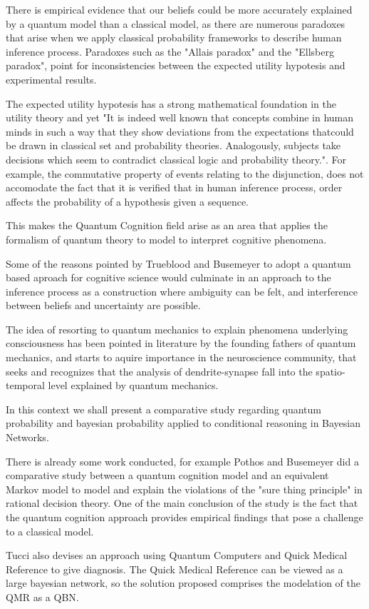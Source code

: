 There is empirical evidence that our beliefs could be more accurately explained by a quantum model than a classical model, as there are numerous paradoxes that arise when we apply classical probability frameworks to describe human inference process\cite[Busemeyer et al]{Busemeyer2009}. 
Paradoxes such as the "Allais paradox" and the "Ellsberg paradox", point for inconsistencies between the expected utility hypotesis and experimental results\cite{Aerts2011}. 

The expected utility hypotesis has a strong mathematical foundation in the utility theory and yet "It is indeed well known that concepts combine in human minds in such a way that they show deviations from the expectations thatcould be drawn in classical set and probability theories. Analogously, subjects take decisions which seem to
contradict classical logic and probability theory."\cite{Aerts2011}. 
For example, the commutative property of events relating to the disjunction, does not accomodate the fact that it is verified\cite{TruebloodJ} that in human inference process, order affects the probability of a hypothesis given a sequence.


This makes the Quantum Cognition field arise as an area that applies the formalism of quantum theory to model to interpret cognitive phenomena. 

Some of the reasons pointed by Trueblood and Busemeyer\cite{Trueblood} to adopt a quantum based aproach for cognitive science would culminate in an approach to the inference process as a construction where ambiguity can be felt, and interference between beliefs and uncertainty are possible. 

The idea of resorting to quantum mechanics to explain phenomena underlying consciousness has been pointed in literature by the founding fathers of quantum mechanics, and starts to aquire importance in the neuroscience community, that seeks and recognizes that the analysis of dendrite-synapse fall into the spatio-temporal level explained by quantum mechanics\cite{Tarlaci2010}.

In this context we shall present a comparative study regarding quantum probability and bayesian probability applied to conditional reasoning in Bayesian Networks. 

There is already some work conducted, for example Pothos and Busemeyer \cite{Pothos2009} did a comparative study between a quantum cognition model and an equivalent Markov model to model and explain the violations of the "sure thing principle" in rational decision theory. 
One of the main conclusion of the study is the fact that the quantum cognition approach provides empirical findings that pose a challenge to a classical model.

Tucci\cite{Tucci2008} also devises an approach using Quantum Computers and Quick Medical Reference to give diagnosis. The Quick Medical Reference can be viewed as a large bayesian network, so the solution proposed comprises the modelation of the QMR as a \ac{QBN}.

